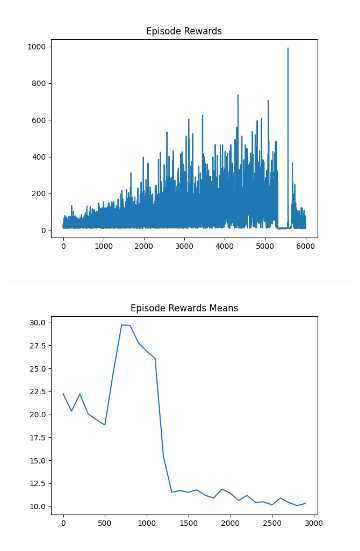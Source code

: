 \begin{figure}[H]
\begin{subfigure}{.47\linewidth}
        \includegraphics[width=\textwidth]{pole/2024-06-13_19-37-45_dqn_cartpole_episode_rewards.png}
    \end{subfigure}
    \begin{subfigure}{.47\linewidth}
        \centering
        \includegraphics[width=\textwidth]{pole/2024-06-13_18-56-41_dqn_cartpole_episode_rewards_means.png}
    \end{subfigure}
\end{figure}
